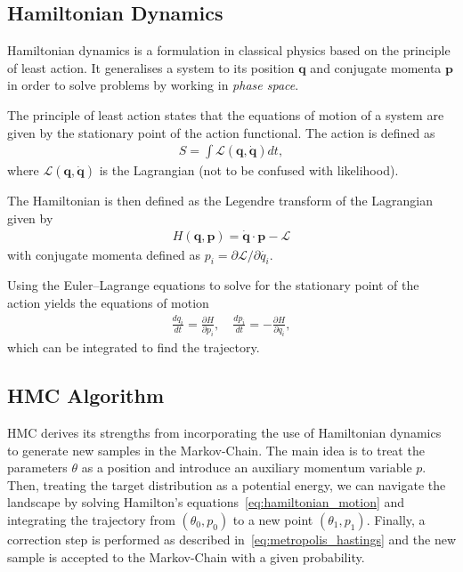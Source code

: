 \documentclass[11pt]{article}
\begin{document}
\subsection{Hamiltonian Dynamics}\label{subsec:hamiltonian_dynamics}
    Hamiltonian dynamics is a formulation in classical physics based on the principle of least action.
    It generalises a system to its position $\mathbf{q}$ and conjugate momenta $\mathbf{p}$ in order to solve problems
    by working in \emph{phase space}.

    The principle of least action states that the equations of motion of a system are given by the stationary point of
    the action functional.
    The action is defined as
    \begin{equation}\label{eq:action_definition}
    \begin{aligned}
        S = \int  \mathcal{L}(\mathbf{q}, \mathbf{\dot{q}}) dt,
    \end{aligned}
    \end{equation}
    where $\mathcal{L}(\mathbf{q}, \mathbf{\dot{q}})$ is the Lagrangian (not to be confused with likelihood).

    The Hamiltonian is then defined as the Legendre transform of the Lagrangian given by
    \begin{equation}\label{eq:hamiltonian_definition}
    \begin{aligned}
        H(\mathbf{q}, \mathbf{p}) = \mathbf{\dot{q}} \cdot \mathbf{p} - \mathcal{L}
    \end{aligned}
    \end{equation}
    with conjugate momenta defined as $p_i = \partial \mathcal{L} / \partial \dot{q_i}$.

    Using the Euler--Lagrange equations to solve for the stationary point of the action yields the equations of motion
    \begin{equation}\label{eq:hamiltonian_motion}
    \begin{aligned}
        \frac{dq_i}{dt} = \frac{\partial H}{\partial p_i}, \quad \frac{dp_i}{dt} = -\frac{\partial H}{\partial q_i},
    \end{aligned}
    \end{equation}
    which can be integrated to find the trajectory.

\subsection{HMC Algorithm}\label{subsec:hmc_algorithm}
    HMC derives its strengths from incorporating the use of Hamiltonian dynamics to generate new samples in the Markov-Chain.
    The main idea is to treat the parameters $\theta$ as a position and introduce an auxiliary momentum variable $p$.
    Then, treating the target distribution as a potential energy, we can navigate the landscape by solving Hamilton's
    equations~\eqref{eq:hamiltonian_motion} and integrating the trajectory from $(\theta_0, p_0)$ to a new point
    $(\theta_1, p_1)$.
    Finally, a correction step is performed as described in~\eqref{eq:metropolis_hastings} and the new sample is accepted
    to the Markov-Chain with a given probability.
\end{document}
